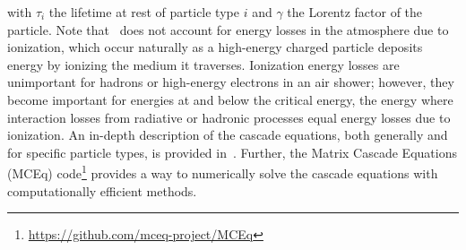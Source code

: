 \noindent
with $\tau_{i}$ the lifetime at rest of particle type $i$ and $\gamma$ the Lorentz factor of the particle.
Note that~ does not account for energy losses in the atmosphere due to ionization, which occur naturally as a high-energy charged particle deposits energy by ionizing the medium it traverses.
Ionization energy losses are unimportant for hadrons or high-energy electrons in an air shower; however, they become important for energies at and below the critical energy, the energy where interaction losses from radiative or hadronic processes equal energy losses due to ionization. 
An in-depth description of the cascade equations, both generally and for specific particle types, is provided in~\cite{tom_book}.
Further, the Matrix Cascade Equations (MCEq) code\footnote[1]{\href{https://github.com/mceq-project/MCEq}{https://github.com/mceq-project/MCEq}} provides a way to numerically solve the cascade equations with computationally efficient methods.






